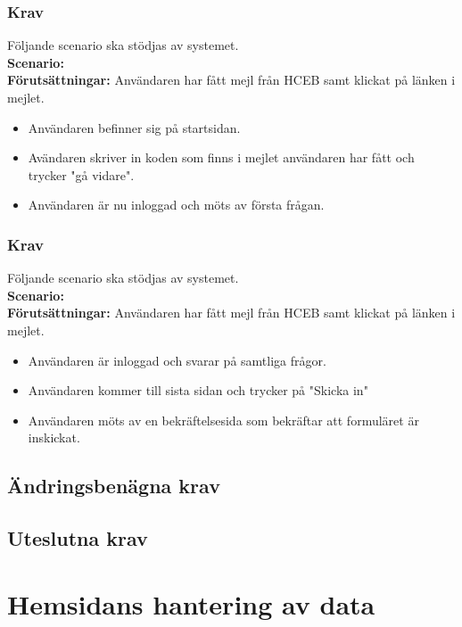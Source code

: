 \documentclass{article}
\begin{document}
        \subsubsection{Krav}
    Följande scenario ska stödjas av systemet.
        \\
       \indent \textbf{Scenario:}
        \\
       \indent \textbf{Förutsättningar:}
       Användaren har fått mejl från HCEB samt klickat på länken i mejlet.
            \begin{itemize}
                \item   Användaren befinner sig på startsidan.
                \item Avändaren skriver in koden som finns i mejlet användaren har fått och trycker "gå vidare".
                \item  Användaren är nu inloggad och möts av första frågan.
            \end{itemize}
        \subsubsection{Krav}
    Följande scenario ska stödjas av systemet.
        \\
       \indent \textbf{Scenario:}
        \\
       \indent \textbf{Förutsättningar:}
       Användaren har fått mejl från HCEB samt klickat på länken i mejlet.
            \begin{itemize}
                \item   Användaren är inloggad och svarar på samtliga frågor.
                \item Användaren kommer till sista sidan och trycker på "Skicka in"
                \item   Användaren möts av en bekräftelsesida som bekräftar att formuläret är inskickat.
            \end{itemize}
     
    
    \subsection{Ändringsbenägna krav}
    \subsection{Uteslutna krav}
    
    \newpage
     \section{Hemsidans hantering av data}
    
\end{document}
